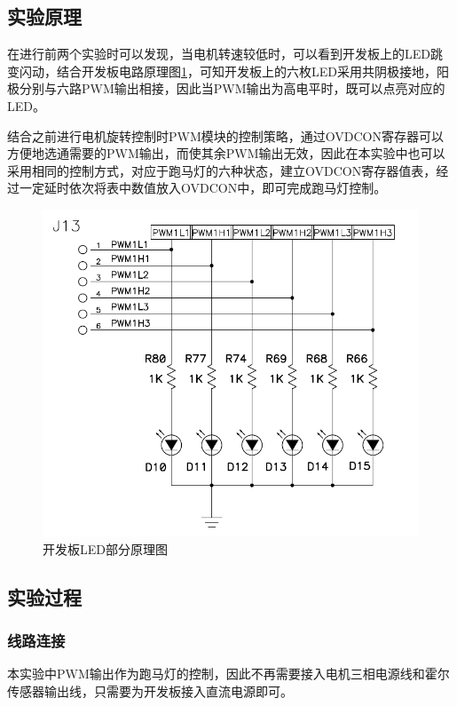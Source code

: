 \documentclass[a4paper,11pt]{ctexart}
\begin{document}
\begin{spacing}{1.5}
\subsection{实验原理}
\par
在进行前两个实验时可以发现，当电机转速较低时，可以看到开发板上的LED跳变闪动，结合开发板电路原理图\ref{figure:LED原理图}，可知开发板上的六枚LED采用共阴极接地，阳极分别与六路PWM输出相接，因此当PWM输出为高电平时，既可以点亮对应的LED。
\par
结合之前进行电机旋转控制时PWM模块的控制策略，通过OVDCON寄存器可以方便地选通需要的PWM输出，而使其余PWM输出无效，因此在本实验中也可以采用相同的控制方式，对应于跑马灯的六种状态，建立OVDCON寄存器值表，经过一定延时依次将表中数值放入OVDCON中，即可完成跑马灯控制。
\begin{figure}[h]
	\centering
	\includegraphics[scale= 0.3]{LED.png}
	\caption{开发板LED部分原理图}\label{figure:LED原理图}
\end{figure}
\subsection{实验过程}
\subsubsection{线路连接}
\par
本实验中PWM输出作为跑马灯的控制，因此不再需要接入电机三相电源线和霍尔传感器输出线，只需要为开发板接入直流电源即可。

\end{spacing}
\end{document}
